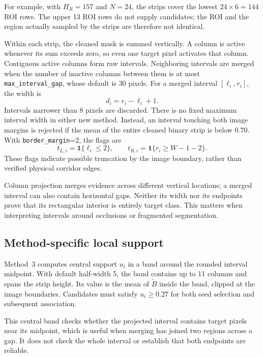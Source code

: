 For example, with $H_R=157$ and $N=24$, the strips cover the lowest
$24\times6=144$ ROI rows. The upper 13 ROI rows do not supply candidates;
the ROI and the region actually sampled by the strips are therefore not
identical.

Within each strip, the cleaned mask is summed vertically. A column is
active whenever its sum exceeds zero, so even one target pixel activates
that column. Contiguous active columns form raw intervals. Neighboring
intervals are merged when the number of inactive columns between them
is at most \texttt{max\_interval\_gap}, whose default is 30 pixels.
For a merged interval $[\ell_i,r_i]$, the width is
\begin{equation}
    d_i=r_i-\ell_i+1.
    \label{eq:c4_interval}
\end{equation}
Intervals narrower than 8 pixels are discarded. There is no fixed maximum
interval width in either new method. Instead, an interval touching both
image margins is rejected if the mean of the entire cleaned binary strip
is below 0.70. With \texttt{border\_margin}=2, the flags are
\begin{equation}
    t_{L,i}=\mathbf{1}\{\ell_i\leq2\},\qquad
    t_{R,i}=\mathbf{1}\{r_i\geq W-1-2\}.
\end{equation}
These flags indicate possible truncation by the image boundary, rather
than verified physical corridor edges.

Column projection merges evidence across different vertical locations;
a merged interval can also contain horizontal gaps. Neither its width
nor its endpoints prove that its rectangular interior is entirely target
class. This matters when interpreting intervals around occlusions or
fragmented segmentation.

\subsection{Method-specific local support}
\label{subsec:c4_support}

Method~3 computes central support $u_i$ in a band around the rounded
interval midpoint. With default half-width 5, the band contains up to
11 columns and spans the strip height. Its value is the mean of
$\widetilde B$ inside the band, clipped at the image boundaries.
Candidates must satisfy $u_i\geq0.27$ for both seed selection and
subsequent association.

This central band checks whether the projected interval contains target
pixels near its midpoint, which is useful when merging has joined two
regions across a gap. It does not check the whole interval or establish
that both endpoints are reliable.

